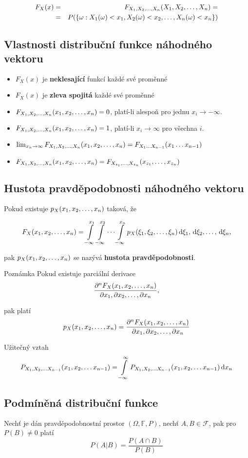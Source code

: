 	\begin{eqnarray*}
	F_X(x)& = &F_{\vecrow[X]}(\vecrow[X])=\\
	&=&P(\brs{\omega: X_1(\omega)<x_1, X_2(\omega)<x_2,\ldots,X_n(\omega)<x_n})
	\end{eqnarray*}

	\subsection{Vlastnosti distribuční funkce náhodného vektoru}
	\begin{itemize}
	\item $F_X(x)$ je \textbf{neklesající} funkcí každé své proměnné
	\item $F_X(x)$ je \textbf{zleva spojitá} každé své proměnné
	\item $F_{\vecrow[X]}(\vecrow[x])=0$, platí-li alespoň pro jednu $x_i\to-\infty$.
	\item $F_{\vecrow[X]}(\vecrow[x])=1$, platí-li $x_i\to\infty$ pro všechna $i$.
	\item $\lim_{x_n\to\infty}F_{\vecrow[X]}(\vecrow[x])=F_{X_1\ldots X_{n-1}}(x_1\ldots x_{n-1})$
	\item $F_{\vecrow[X]}(\vecrow[x])=F_{X_{z_1},\ldots,X_{z_n}}(x_{z_1},\ldots,x_{z_n})$
	\end{itemize}

	\subsection{Hustota pravděpodobnosti náhodného vektoru}
	Pokud existuje $p_X(\vecrow[x])$ taková, že

	\[ F_X(\vecrow[x])=\int\limits_{-\infty}^{x_1}\int\limits_{-\infty}^{x_2}\cdots\int\limits_{-\infty}^{x_n} p_X(\vecrow[\xi])\vecrow[\d\xi], \]

	pak $p_X(\vecrow[x])$ se nazývá \textbf{hustota pravděpodobnosti}.

	\begin{note}{Poznámka}
	Pokud existuje parciální derivace
	\[ \frac{\partial^n F_X(\vecrow[x])}{\vecrow[\partial x]}, \]

	pak platí
	\[ p_X(\vecrow[x])=\frac{\partial^n F_X(\vecrow[x])}{\vecrow[\partial x]} \]

	Užitečný vztah
	\[ P_{X_1,X_2,\ldots X_{n-1}}(x_1,x_2,\ldots x_{n-1}) = \int\limits_{-\infty}^\infty P_{X_1,X_2,\ldots X_{n-1}}(x_1,x_2,\ldots x_{n-1})\d x_n \]
	\end{note}

	\subsection{Podmíněná distribuční funkce}
	Nechť je dán pravděpodobnostní prostor $(\Omega,\mathbb{F},P)$, nechť $A,B\in\mathscr{F}$, pak pro $P(B)\neq 0$ platí
	\[ P(A|B)=\frac{P(A\cap B)}{P(B)} \]

